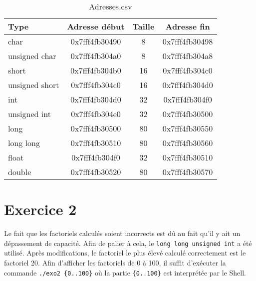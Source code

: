 \documentclass{report}
\begin{document}
\begin{table}[h]
	\centering
	\begin{tabular}{|l|c|c|c|}
		\hline
		\textbf{Type}	&\textbf{Adresse début}	&\textbf{Taille}	&\textbf{Adresse fin}	\\
		\hline
		char			&0x7fff4fb30490			&8					&0x7fff4fb30498	\\
		\hline
		unsigned char	&0x7fff4fb304a0			&8					&0x7fff4fb304a8	\\
		\hline
		short			&0x7fff4fb304b0			&16					&0x7fff4fb304c0	\\
		\hline
		unsigned short	&0x7fff4fb304c0			&16					&0x7fff4fb304d0	\\
		\hline
		int				&0x7fff4fb304d0			&32					&0x7fff4fb304f0	\\
		\hline
		unsigned int	&0x7fff4fb304e0			&32					&0x7fff4fb30500	\\
		\hline
		long			&0x7fff4fb30500			&80					&0x7fff4fb30550	\\
		\hline
		long long		&0x7fff4fb30510			&80					&0x7fff4fb30560	\\
		\hline
		float			&0x7fff4fb304f0			&32					&0x7fff4fb30510	\\
		\hline
		double			&0x7fff4fb30520			&80					&0x7fff4fb30570	\\
		\hline
	\end{tabular}
	\caption{Adresses.csv}
	\label{tab:addr}
\end{table}

\section{Exercice 2}

Le fait que les factoriels calculés soient incorrects est dû au fait qu'il y
ait un dépassement de capacité. Afin de palier à cela, le \texttt{long long
unsigned int} a été utilisé. Après modifications, le factoriel le plus élevé
calculé correctement est le factoriel 20. Afin d'afficher les factoriels de 0 à
100, il suffit d'exécuter la commande \texttt{./exo2 \{0..100\}} où la partie
\texttt{\{0..100\}} est interprétée par le Shell.
\end{document}
